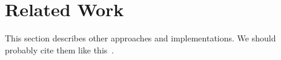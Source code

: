\section{Related Work}
This section describes other approaches and implementations.
We should probably cite them like this~\cite{Authors14}.
